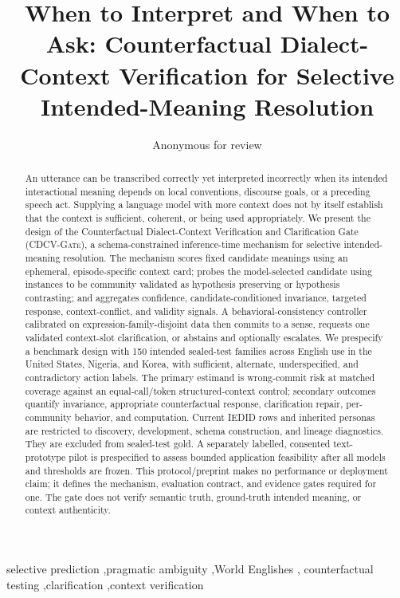 \documentclass[preprint,12pt,authoryear]{elsarticle}
\newcommand{\cdcv}{\textsc{CDCV-Gate}}
\begin{document}
\begin{frontmatter}

\title{When to Interpret and When to Ask: Counterfactual Dialect-Context
Verification for Selective Intended-Meaning Resolution}


\author{Anonymous for review}

\begin{abstract}
An utterance can be transcribed correctly yet interpreted incorrectly when its
intended interactional meaning depends on local conventions, discourse goals,
or a preceding speech act. Supplying a language model with more context does
not by itself establish that the context is sufficient, coherent, or being
used appropriately. We present the design of the Counterfactual
Dialect-Context Verification and Clarification Gate (\cdcv), a
schema-constrained inference-time mechanism for selective intended-meaning
resolution. The mechanism scores fixed candidate meanings using an ephemeral,
episode-specific context card; probes the model-selected candidate using
instances to be community validated as hypothesis preserving or hypothesis
contrasting;
and aggregates confidence, candidate-conditioned invariance, targeted
response, context-conflict, and validity signals. A behavioral-consistency
controller calibrated on
expression-family-disjoint data then commits to a sense, requests one
validated context-slot clarification, or abstains and optionally escalates.
We prespecify a benchmark design with 150 intended sealed-test families
across English use in the United States, Nigeria, and Korea, with sufficient,
alternate, underspecified, and
contradictory action labels. The primary estimand is wrong-commit risk at
matched coverage against an equal-call/token structured-context control;
secondary outcomes quantify invariance, appropriate counterfactual response,
clarification repair, per-community behavior, and computation. Current IEDID
rows and inherited personas are restricted to discovery, development, schema
construction, and lineage diagnostics. They are excluded from sealed-test
gold. A separately labelled, consented text-prototype pilot is prespecified to
assess bounded application feasibility after all models and thresholds are
frozen. This protocol/preprint makes no performance or deployment claim; it
defines the mechanism, evaluation contract, and evidence gates required for
one. The gate does not verify semantic truth, ground-truth intended meaning,
or context authenticity.
\end{abstract}

\begin{keyword}
selective prediction \sep pragmatic ambiguity \sep World Englishes \sep
counterfactual testing \sep clarification \sep context verification
\end{keyword}

\end{frontmatter}
\end{document}
